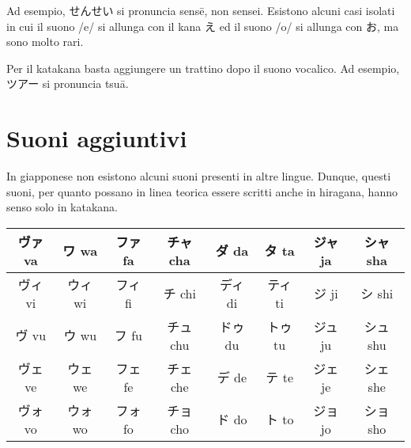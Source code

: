 \documentclass{article}
\begin{document}
        Ad esempio, \textjapanese{せんせい} si pronuncia \textjapanese{sens\={e}}, non \textjapanese{sensei}. Esistono
        alcuni casi isolati in cui il suono \textjapanese{/e/} si allunga con il kana \textjapanese{え} ed il suono
        \textjapanese{/o/} si allunga con \textjapanese{お}, ma sono molto rari.

        Per il katakana basta aggiungere un trattino dopo il suono vocalico. Ad esempio, \textjapanese{ツアー} si
        pronuncia \textjapanese{tsu\={a}}.

    \section{Suoni aggiuntivi}

        In giapponese non esistono alcuni suoni presenti in altre lingue. Dunque, questi suoni, per quanto possano
        in linea teorica essere scritti anche in hiragana, hanno senso solo in katakana.

        \begin{center}
            \begin{japanese}
                \begin{tabular}{|c|c|c|c|c|c|c|c|}
                    \hline
                    ヴァ va & ワ wa & ファ fa & チャ cha & ダ da & タ ta & ジャ ja & シャ sha\\
                    \hline
                    ヴィ vi & ウィ wi & フィ fi & チ chi & ディ di & ティ ti & ジ ji & シ shi\\
                    \hline
                    ヴ vu & ウ wu & フ fu & チュ chu & ドゥ du & トゥ tu & ジュ ju & シュ shu\\
                    \hline
                    ヴェ ve & ウェ we & フェ fe & チェ che & デ de & テ te & ジェ je & シェ she\\
                    \hline
                    ヴォ vo & ウォ wo & フォ fo & チョ cho & ド do & ト to & ジョ jo & ショ sho\\
                    \hline
                \end{tabular}
            \end{japanese}
        \end{center}
\end{document}
